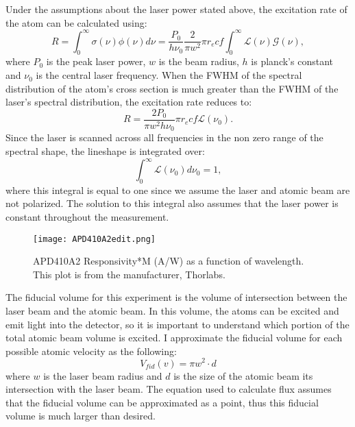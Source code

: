 \documentclass[12pt, a4paper]{article}
\begin{document}
Under the assumptions about the laser power stated above, the excitation rate of the atom can be calculated using:
\begin{equation}
R = \int_{0}^{\infty}\sigma(\nu) \phi(\nu)d\nu = \frac{P_0}{h \nu_0} \frac{2}{\pi w^2} \pi r_e c f \int_{0}^{\infty} \mathscr{L}(\nu) \mathscr{G}(\nu),
\end{equation}
where $P_0$ is the peak laser power, $w$ is the beam radius, $h$ is planck's constant and $\nu_0$ is the central laser frequency. When the FWHM of the spectral distribution of the atom's cross section is much greater than the FWHM of the laser's spectral distribution, the excitation rate reduces to:
\begin{equation}
R =\frac{2P_0}{\pi w^2 h \nu_0} \pi r_e c f \mathscr{L} (\nu_0).
\end{equation}
Since the laser is scanned across all frequencies in the non zero range of the spectral shape, the lineshape is integrated over:
\begin{equation}
\int_0^{\infty}\mathscr{L} (\nu_0)d\nu_0 = 1,
\end{equation}
where this integral is equal to one since we assume the laser and atomic beam are not polarized. The solution to this integral also assumes that the laser power is constant throughout the measurement.

\begin{wrapfigure}{r}{0.45\textwidth}
  \texttt{[image: APD410A2edit.png]}
  \vspace*{-3mm}
  \caption{APD410A2 Responsivity*M (A/W) as a function of wavelength. This plot is from the manufacturer, Thorlabs.}
\end{wrapfigure}



The fiducial volume for this experiment is the volume of intersection between the laser beam and the atomic beam. In this volume, the atoms can be excited and emit light into the detector, so it is important to understand which portion of the total atomic beam volume is excited. I approximate the fiducial volume for each possible atomic velocity as the following:
\begin{equation}
V_{fid}(v) = \pi w^2\cdot d
\end{equation}
where $w$ is the laser beam radius and $d$ is the size of the atomic beam its intersection with the laser beam. The equation used to calculate flux assumes that the fiducial volume can be approximated as a point, thus this fiducial volume is much larger than desired. 
\end{document}
